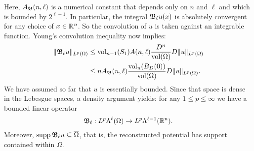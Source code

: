 \documentclass[10pt,letterpaper]{article}
\begin{document}
Here, $A_{{\mathfrak B}}(n,\ell)$ is a numerical constant that depends only on $n$ and $\ell$ 
and which is bounded by $2^{\ell-1}$. 
In particular, the integral ${\mathfrak B}_{\ell} u(x)$ is absolutely convergent for any choice of $x \in {\mathbb R}^{n}$. 
So the convolution of $u$ is taken against an integrable function. 
Young's convolution inequality now implies: 
\begin{align*}
    \| {\mathfrak B}_{\ell} u \|_{L^{p}(\Omega)}
    &
    \leq 
    \operatorname{vol}_{n-1}(S_1) A(n,\ell) \frac{ D^{n} }{\operatorname{vol}(\Omega)} 
    D
    \| u \|_{L^{p}(\Omega)}
    \\&
    \leq 
    n A_{{\mathfrak B}}(n,\ell) \frac{ \operatorname{vol}_{n}(B_D(0)) }{\operatorname{vol}(\Omega)} 
    D
    \| u \|_{L^{p}(\Omega)}
    .
\end{align*}
We have assumed so far that $u$ is essentially bounded.
Since that space is dense in the Lebesgue spaces, a density argument yields: 
for any $1 \leq p \leq \infty$ we have a bounded linear operator 
\begin{gather*}
    {\mathfrak B}_{\ell} : L^{p}\Lambda^{\ell}(\Omega) \rightarrow L^{p}\Lambda^{\ell-1}({\mathbb R}^n).
\end{gather*}
Moreover, $\operatorname{supp} {\mathfrak B}_{\ell} u \subseteq \overline\Omega$,
that is, the reconstructed potential has support contained within $\overline\Omega$. 
\\
\end{document}
